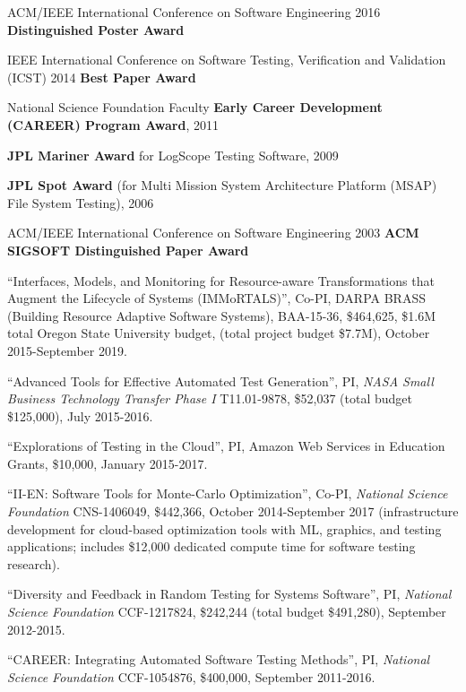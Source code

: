 \documentclass[ComputerScience,10pt]{vita}
\begin{document}
\begin{vita}
\begin{Honors}
\item ACM/IEEE International Conference on Software Engineering 2016 {\bf Distinguished Poster Award}
  \item IEEE International Conference on Software Testing, Verification and Validation (ICST) 2014 {\bf Best Paper Award}
  \item National Science Foundation Faculty {\bf Early Career Development (CAREER) Program Award}, 2011
  \item {\bf JPL Mariner Award} for LogScope Testing Software, 2009
  \item {\bf JPL Spot Award} (for Multi Mission System Architecture Platform
  (MSAP) File System Testing), 2006 \item ACM/IEEE International Conference on Software Engineering 2003 {\bf ACM SIGSOFT
  Distinguished Paper Award} 
\end{Honors}


\begin{Funding}
\item ``Interfaces, Models, and Monitoring for Resource-aware
  Transformations that Augment the Lifecycle of Systems (IMMoRTALS)'',
  Co-PI, DARPA BRASS (Building Resource Adaptive Software Systems), BAA-15-36, \$464,625, \$1.6M total Oregon State University budget, (total project budget \$7.7M), October 2015-September 2019.
\item ``Advanced Tools for Effective Automated Test Generation'', PI, \emph{NASA Small Business Technology Transfer Phase I} T11.01-9878, \$52,037 (total budget \$125,000), July 2015-2016.
\item ``Explorations of Testing in the Cloud'', PI, Amazon Web Services in Education Grants, \$10,000, January 2015-2017.
\item ``II-EN: Software Tools for Monte-Carlo Optimization'', Co-PI, \emph{National Science Foundation} CNS-1406049, \$442,366, October 2014-September 2017 (infrastructure development for cloud-based optimization tools with ML, graphics, and testing applications; includes \$12,000 dedicated compute time for software testing research).
\item ``Diversity and Feedback in Random Testing for Systems
  Software'', PI, \emph{National Science Foundation} CCF-1217824, \$242,244 (total budget \$491,280), September 2012-2015.
\item ``CAREER: Integrating Automated Software Testing Methods'', PI, \emph{National Science Foundation} CCF-1054876, \$400,000, September 2011-2016.
\end{Funding}



\end{vita}
\end{document}
